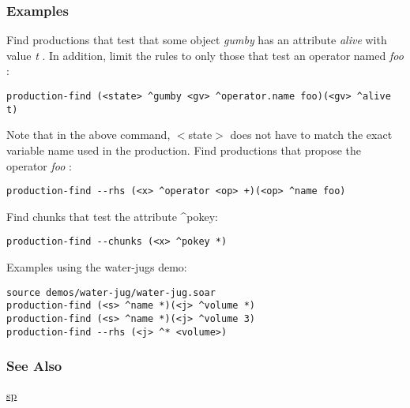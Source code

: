 \subsubsection*{Examples}
 Find productions that test that some object \emph{gumby}
 has an attribute \emph{alive}
 with value \emph{t}
. In addition, limit the rules to only those that test an operator named \emph{foo}
: \begin{verbatim}
production-find (<state> ^gumby <gv> ^operator.name foo)(<gv> ^alive t)
\end{verbatim}
 Note that in the above command, $<$state$>$ does not have to match the exact variable name used in the production. 
 Find productions that propose the operator \emph{foo}
: \begin{verbatim}
production-find --rhs (<x> ^operator <op> +)(<op> ^name foo)
\end{verbatim}
 Find chunks that test the attribute \^{}pokey: \begin{verbatim}
production-find --chunks (<x> ^pokey *)
\end{verbatim}
 Examples using the water-jugs demo: \begin{verbatim}
source demos/water-jug/water-jug.soar
production-find (<s> ^name *)(<j> ^volume *)
production-find (<s> ^name *)(<j> ^volume 3)
production-find --rhs (<j> ^* <volume>)
\end{verbatim}
\subsubsection*{See Also}
\hyperref[sp]{sp} 